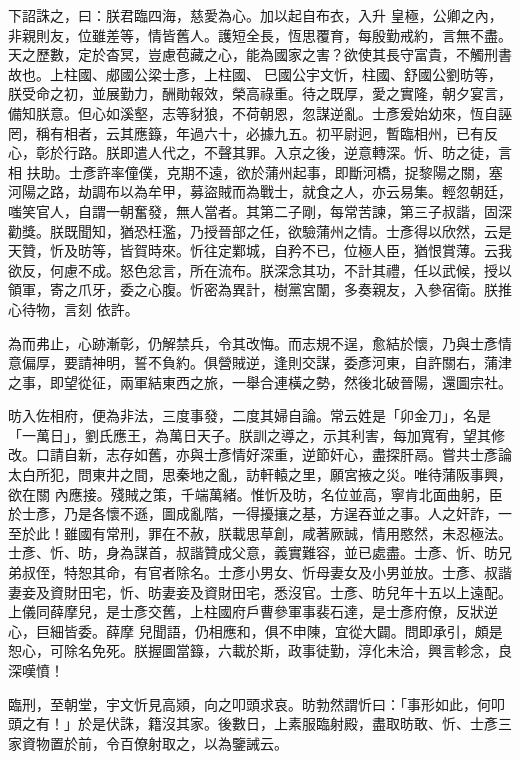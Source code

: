 \begin{pinyinscope}
 下詔誅之，曰：朕君臨四海，慈愛為心。加以起自布衣，入升
 皇極，公卿之內，非親則友，位雖差等，情皆舊人。護短全長，恆思覆育，每殷勤戒約，言無不盡。天之歷數，定於杳冥，豈慮苞藏之心，能為國家之害？欲使其長守富貴，不觸刑書故也。上柱國、郕國公梁士彥，上柱國、巳國公宇文忻，柱國、舒國公劉昉等，朕受命之初，並展勤力，酬勛報效，榮高祿重。待之既厚，愛之實隆，朝夕宴言，備知朕意。但心如溪壑，志等豺狼，不荷朝恩，忽謀逆亂。士彥爰始幼來，恆自誣罔，稱有相者，云其應籙，年過六十，必據九五。初平尉迥，暫臨相州，已有反心，彰於行路。朕即遣人代之，不聲其罪。入京之後，逆意轉深。忻、昉之徒，言相
 扶助。士彥許率僮僕，克期不遠，欲於蒲州起事，即斷河橋，捉黎陽之關，塞河陽之路，劫調布以為牟甲，募盜賊而為戰士，就食之人，亦云易集。輕忽朝廷，嗤笑官人，自謂一朝奮發，無人當者。其第二子剛，每常苦諫，第三子叔諧，固深勸獎。朕既聞知，猶恐枉濫，乃授晉部之任，欲驗蒲州之情。士彥得以欣然，云是天贊，忻及昉等，皆賀時來。忻往定鄴城，自矜不已，位極人臣，猶恨賞薄。云我欲反，何慮不成。怒色忿言，所在流布。朕深念其功，不計其禮，任以武候，授以領軍，寄之爪牙，委之心腹。忻密為異計，樹黨宮闈，多奏親友，入參宿衛。朕推心待物，言刻
 依許。



 為而弗止，心跡漸彰，仍解禁兵，令其改悔。而志規不逞，愈結於懷，乃與士彥情意偏厚，要請神明，誓不負約。俱營賊逆，逢則交謀，委彥河東，自許關右，蒲津之事，即望從征，兩軍結東西之旅，一舉合連橫之勢，然後北破晉陽，還圖宗社。



 昉入佐相府，便為非法，三度事發，二度其婦自論。常云姓是「卯金刀」，名是「一萬日」，劉氏應王，為萬日天子。朕訓之導之，示其利害，每加寬宥，望其修改。口請自新，志存如舊，亦與士彥情好深重，逆節奸心，盡探肝鬲。嘗共士彥論太白所犯，問東井之間，思秦地之亂，訪軒轅之里，願宮掖之災。唯待蒲阪事興，欲在關
 內應接。殘賊之策，千端萬緒。惟忻及昉，名位並高，寧肯北面曲躬，臣於士彥，乃是各懷不遜，圖成亂階，一得擾攘之基，方逞吞並之事。人之奸詐，一至於此！雖國有常刑，罪在不赦，朕載思草創，咸著厥誠，情用愍然，未忍極法。士彥、忻、昉，身為謀首，叔諧贊成父意，義實難容，並已處盡。士彥、忻、昉兄弟叔侄，特恕其命，有官者除名。士彥小男女、忻母妻女及小男並放。士彥、叔諧妻妾及資財田宅，忻、昉妻妾及資財田宅，悉沒官。士彥、昉兒年十五以上遠配。上儀同薛摩兒，是士彥交舊，上柱國府戶曹參軍事裴石達，是士彥府僚，反狀逆心，巨細皆委。薛摩
 兒聞語，仍相應和，俱不申陳，宜從大闢。問即承引，頗是恕心，可除名免死。朕握圖當籙，六載於斯，政事徒勤，淳化未洽，興言軫念，良深嘆憤！



 臨刑，至朝堂，宇文忻見高熲，向之叩頭求哀。昉勃然謂忻曰：「事形如此，何叩頭之有！」於是伏誅，籍沒其家。後數日，上素服臨射殿，盡取昉敢、忻、士彥三家資物置於前，令百僚射取之，以為鑒誡云。




\end{pinyinscope}
